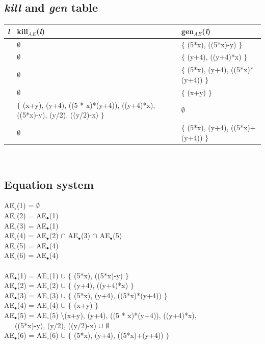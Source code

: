 \documentclass[a4paper, 12pt]{article}
\newcommand{\tab}{\-\ \hspace{.5cm}}
\begin{document}
\subsection{\textit{kill} and \textit{gen} table}
\begin{center}
	\begin{tabular}{| >{\centering\arraybackslash} m{2cm} | >{\centering\arraybackslash} m{6cm} | >{\centering\arraybackslash} m{4cm} |} 
		\hline
		\textit{l} & kill$_A$$_E$(\textit{l}) & gen$_A$$_E$(\textit{l}) \\
		\hline
		1 & $\emptyset$ & $\lbrace$ (5*x), ((5*x)-y) $\rbrace$ \\
		\hline
		2 & $\emptyset$ & $\lbrace$ (y+4), ((y+4)*x) $\rbrace$ \\
		\hline
		3 & $\emptyset$ & $\lbrace$ (5*x), (y+4), ((5*x)*(y+4)) $\rbrace$ \\
		\hline
		4 & $\emptyset$ & $\lbrace$ (x+y) $\rbrace$ \\[0.25cm]
		\hline
		5 & $\lbrace$ (x+y), (y+4), ((5 * x)*(y+4)), ((y+4)*x), ((5*x)-y), (y/2), ((y/2)-x) $\rbrace$ & $\emptyset$ \\
		\hline
		6 & $\emptyset$ & $\lbrace$ (5*x), (y+4), ((5*x)+(y+4)) $\rbrace$ \\
		\hline
	\end{tabular}
\end{center} ~\\

\subsection{Equation system}
AE$_\circ$(1) = $\emptyset$ \\
AE$_\circ$(2) = AE$_\bullet$(1) \\
AE$_\circ$(3) = AE$_\bullet$(1) \\
AE$_\circ$(4) = AE$_\bullet$(2) $\cap$ AE$_\bullet$(3) $\cap$ AE$_\bullet$(5) \\
AE$_\circ$(5) = AE$_\bullet$(4) \\
AE$_\circ$(6) = AE$_\bullet$(4) \\ \\
AE$_\bullet$(1) = AE$_\circ$(1) $\cup$ $\lbrace$ (5*x), ((5*x)-y) $\rbrace$ \\
AE$_\bullet$(2) = AE$_\circ$(2) $\cup$ $\lbrace$ (y+4), ((y+4)*x) $\rbrace$ \\
AE$_\bullet$(3) = AE$_\circ$(3) $\cup$ $\lbrace$ (5*x), (y+4), ((5*x)*(y+4)) $\rbrace$ \\
AE$_\bullet$(4) = AE$_\circ$(4) $\cup$ $\lbrace$ (x+y) $\rbrace$ \\
AE$_\bullet$(5) = AE$_\circ$(5) \textbackslash(x+y), (y+4), ((5 * x)*(y+4)), ((y+4)*x), \\ 
\tab \tab \tab ((5*x)-y), (y/2), ((y/2)-x) $\cup$ $\emptyset$ \\
AE$_\bullet$(6) = AE$_\circ$(6) $\cup$ $\lbrace$ (5*x), (y+4), ((5*x)+(y+4)) $\rbrace$ \\
\end{document}
